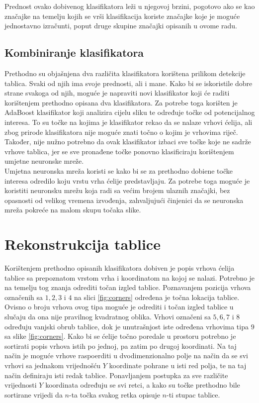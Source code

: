 \documentclass[times, utf8, zavrsni, numeric]{fer}
\begin{document}
Prednost ovako dobivenog klasifikatora leži u njegovoj brzini, pogotovo ako se kao značajke na temelju kojih se vrši klasifikacija koriste značajke koje je moguće jednostavno izračunti, poput druge skupine značajki opisanih u ovome radu.


\subsection{Kombiniranje klasifikatora}
Prethodno su objašnjena dva različita klasifikatora korištena prilikom detekcije tablica.
Svaki od njih ima svoje prednosti, ali i mane.
Kako bi se iskoristile dobre strane svakoga od njih, moguće je napraviti novi klasifikator koji će raditi korištenjem prethodno opisana dva klasifikatora.
Za potrebe toga korišten je AdaBoost klasifikator koji analizira cijelu sliku te određuje točke od potencijalnog interesa. 
To su točke na kojima je klasifikator rekao da se nalaze vrhovi ćelija, ali zbog prirode klasifikatora nije moguće znati točno o kojim je vrhovima riječ.
Također, nije nužno potrebno da ovak klasifikator izbaci sve točke koje ne sadrže vrhove tablica, jer se sve pronađene točke ponovno klasificiraju korištenjem umjetne neuronske mreže.\\

Umjetna neuronska mreža koristi se kako bi se za prethodno dobiene točke interesa odredilo koju vrstu vrha ćelije predstavljaju.
Za potrebe toga moguće je koristiti neuronsku mrežu koja radi sa većim brojem ulaznih značajki, bez opasnosti od velikog vremena izvođenja, zahvaljujući činjenici da se neuronska mreža pokreće na malom skupu točaka slike. 

\section{Rekonstrukcija tablice}
Korištenjem prethodno opisanih klasifikatora dobiven je popis vrhova ćelija tablice sa prepoznatom vrstom vrha i koordinatom na kojoj se nalazi.
Potrebno je na temelju tog znanja odrediti točan izgled tablice. 
Poznavanjem pozicija vrhova označenih sa $1, 2, 3$ i $4$ na slici \ref{fig:corners} određena je točna lokacija tablice. 
Ovisno o broju vrhova ovog tipa moguće je odrediti i točan izgled tablice u slučaju da ona nije pravilnog kvadratnog oblika.
Vrhovi označeni sa $5, 6, 7$ i $8$ određuju vanjski obrub tablice, dok je unutrašnjost iste određena vrhovima tipa $9$ sa slike \ref{fig:corners}.
Kako bi se ćelije točno poredale u prostoru potrebno je sortirati popis vrhova istih po jednoj, pa zatim po drugoj koordinati.
Na taj način je moguće vrhove raspoerditi u dvodimenzionalno polje na način da se svi vrhovi sa jednakom vrijednošću $Y$ koordinate pohrane u isti red polja, te na taj način definiraju isti redak tablice.
Ponavljanjem postupka za sve različite vrijednosti $Y$ koordinata određuju se svi retci, a kako su točke prethodno bile sortirane vrijedi da $n$-ta točka svakog retka opisuje $n$-ti stupac tablice.
\end{document}

